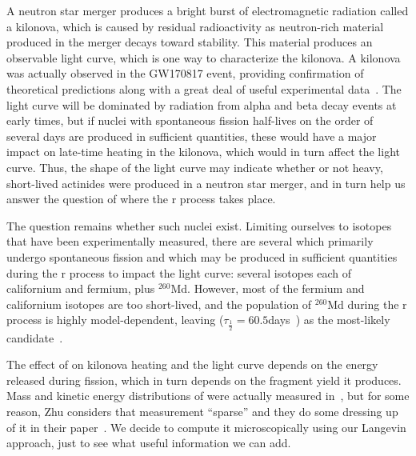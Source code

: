 A neutron star merger produces a bright burst of electromagnetic radiation called a kilonova, which is caused by residual radioactivity as neutron-rich material produced in the merger decays toward stability. This material produces an observable light curve, which is one way to characterize the kilonova. A kilonova was actually observed in the GW170817 event, providing confirmation of theoretical predictions along with a great deal of useful experimental data~\cite{drout2017}. The light curve will be dominated by radiation from alpha and beta decay events at early times, but if nuclei with spontaneous fission half-lives on the order of several days are produced in sufficient quantities, these would have a major impact on late-time heating in the kilonova, which would in turn affect the light curve. Thus, the shape of the light curve may indicate whether or not heavy, short-lived actinides were produced in a neutron star merger, and in turn help us answer the question of where the r process takes place.

The question remains whether such nuclei exist. Limiting ourselves to isotopes that have been experimentally measured, there are several which primarily undergo spontaneous fission and which may be produced in sufficient quantities during the r process to impact the light curve: several isotopes each of californium and fermium, plus $^{260}$Md. However, most of the fermium and californium isotopes are too short-lived, and the population of $^{260}$Md during the r process is highly model-dependent, leaving {\Cf} ($\tau_\frac{1}{2} = 60.5$days~\cite{NuDat}) as the most-likely candidate~\cite{Zhu2018}.%

The effect of {\Cf} on kilonova heating and the light curve depends on the energy released during fission, which in turn depends on the fragment yield it produces. Mass and kinetic energy distributions of {\Cf} were actually measured in~\cite{Brandt1963}, but for some reason, Zhu considers that measurement ``sparse'' and they do some dressing up of it in their paper~\cite{Zhu2018}. We decide to compute it microscopically using our Langevin approach, just to see what useful information we can add.



